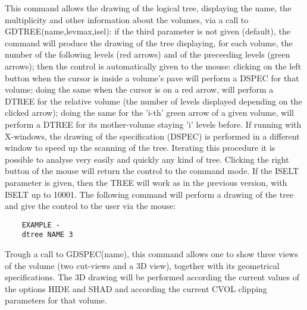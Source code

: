 \ENDCMD


\BEGARG
{}
\ENDARG

   \par
This command allows the drawing of the logical tree, displaying the name, 
   the multiplicity and other information about the volumes, via a call to 
   GDTREE(name,levmax,isel):  if the third parameter is not given (default), 
   the command will produce the drawing of the tree displaying, for each 
   volume, the number of the following levels (red arrows) and of the 
   preceeding levels (green arrows); then the control is automatically given 
   to the mouse: clicking on the left button when the cursor is inside a 
   volume's pave will perform a DSPEC for that volume; doing the same when the 
   cursor is on a red arrow, will perform a DTREE for the relative volume (the 
   number of levels displayed depending on the clicked arrow); doing the same 
   for the 'i-th' green arrow of a given volume, will perform a DTREE for its 
   mother-volume staying 'i' levels before.  If running with X-windows, the 
   drawing of the specification (DSPEC) is performed in a different window to 
   speed up the scanning of the tree.  Iterating this procedure it is possible 
   to analyse very easily and quickly any kind of tree. Clicking the right 
   button of the mouse will return the control to the command mode.  If the 
   ISELT parameter is given, then the TREE will work as in the previous 
   version, with ISELT up to 10001.  The following command will perform a 
   drawing of the tree and give the control to the user via the mouse:  
\begin{verbatim}
    EXAMPLE -
    dtree NAME 3
\end{verbatim}

\ENDCMD


\BEGARG
{}
\ENDARG

   \par
Trough a call to GDSPEC(name), this command allows one to show three views 
   of the volume (two cut-views and a 3D view), together with its geometrical 
   specifications. The 3D drawing will be performed according the current 
   values of the options HIDE and SHAD and according the current CVOL clipping 
   parameters for that volume.  


